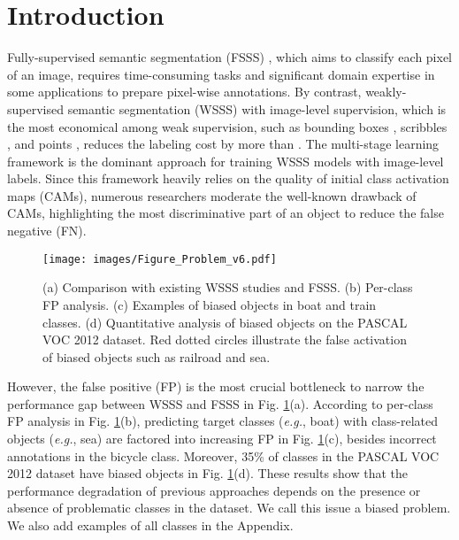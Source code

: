 \documentclass[10pt,twocolumn,letterpaper]{article}
\begin{document}
\vspace{-0.5cm}

\section{Introduction}









Fully-supervised semantic segmentation (FSSS) \cite{chen2017deeplab, chen2018encoder}, which aims to classify each pixel of an image, requires time-consuming tasks and significant domain expertise in some applications \cite{yu2018methods} to prepare pixel-wise annotations. By contrast, weakly-supervised semantic segmentation (WSSS) with image-level supervision, which is the most economical among weak supervision, such as bounding boxes \cite{dai2015boxsup}, scribbles \cite{lin2016scribblesup}, and points \cite{bearman2016s}, reduces the labeling cost by more than  \cite{bearman2016s}. The multi-stage learning framework is the dominant approach for training WSSS models with image-level labels. Since this framework heavily relies on the quality of initial class activation maps (CAMs), numerous researchers \cite{ahn2018learning, wang2020self, lee2021anti, chen2022class, xie2022clims, jo2022recurseed} moderate the well-known drawback of CAMs, highlighting the most discriminative part of an object to reduce the false negative (FN).

\begin{figure}[t]
  \centering
  \texttt{[image: images/Figure\_Problem\_v6.pdf]}
\caption{
      (a) Comparison with existing WSSS studies \cite{wang2020self, jo2022recurseed} and FSSS. (b) Per-class FP analysis. (c) Examples of biased objects in boat and train classes. (d) Quantitative analysis of biased objects on the PASCAL VOC 2012 dataset. Red dotted circles illustrate the false activation of biased objects such as railroad and sea.
  }
  \label{fig:problem}
  \vspace{-0.5cm}
\end{figure}









However, the false positive (FP) is the most crucial bottleneck to narrow the performance gap between WSSS and FSSS in Fig. \ref{fig:problem}(a). According to per-class FP analysis in Fig. \ref{fig:problem}(b), predicting target classes (\emph{e.g.}, boat) with class-related objects (\emph{e.g.}, sea) are factored into increasing FP in Fig. \ref{fig:problem}(c), besides incorrect annotations in the bicycle class. Moreover, 35\% of classes in the PASCAL VOC 2012 dataset have biased objects in Fig. \ref{fig:problem}(d). These results show that the performance degradation of previous approaches depends on the presence or absence of problematic classes in the dataset. We call this issue a biased problem. We also add examples of all classes in the Appendix.
\end{document}

